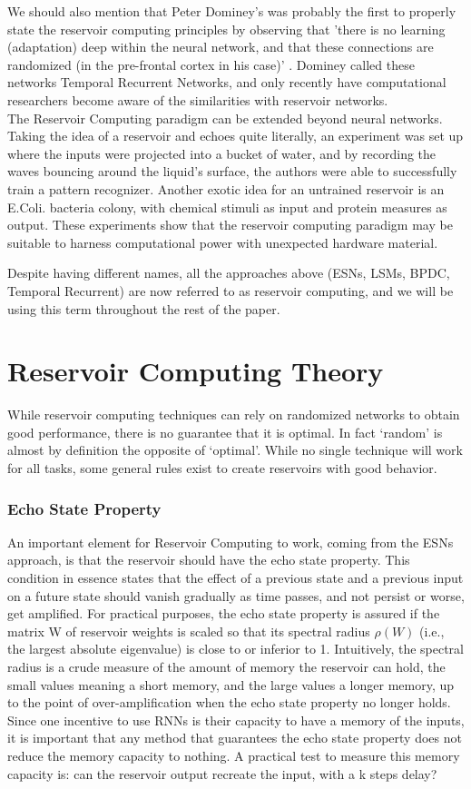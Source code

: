 \documentclass[12pt,oneside]{CUNY_CS_PhD}
\begin{document}
We should also mention that Peter Dominey's was probably the first to properly state the reservoir computing principles by observing that 'there is no learning (adaptation) deep within the neural network, and that these connections are randomized (in the pre-frontal cortex in his case)' \cite{DomineyRamus00}. Dominey called these networks Temporal Recurrent Networks, and only recently have computational researchers become aware of the similarities with reservoir networks.\\
The Reservoir Computing paradigm can be extended beyond neural networks. Taking the idea of a reservoir and echoes quite literally, an experiment was set up where the inputs were projected into a bucket of water, and by recording the waves bouncing around the liquid's surface, the authors were able to successfully train a pattern recognizer. Another exotic idea for an untrained reservoir is an E.Coli. bacteria colony, with chemical stimuli as input and protein measures as output. These experiments show that the reservoir computing paradigm may be suitable to harness computational power with unexpected hardware material.

Despite having different names, all the approaches above (ESNs, LSMs, BPDC, Temporal Recurrent) are now referred to as reservoir computing, and we will be using this term throughout the rest of the paper.

\section{Reservoir Computing Theory}
\label{theory} 
While reservoir computing techniques can rely on randomized networks to obtain good performance, there is no guarantee that it is optimal. In fact `random' is almost by definition the opposite of `optimal'. While no single technique will work for all tasks, some general rules exist to create reservoirs with good behavior.

\subsubsection{Echo State Property}
An important element for Reservoir Computing to work, coming from the ESNs approach, is that the reservoir should have the echo state property. This condition in essence states that the effect of a previous state and a previous input on a future state should vanish gradually as time passes, and not persist or worse, get amplified. For practical purposes, the echo state property is assured if the matrix W of reservoir weights is scaled so that its spectral radius $\rho(W)$ (i.e., the largest absolute eigenvalue) is close to or inferior to 1. Intuitively, the spectral radius is a crude measure of the amount of memory the reservoir can hold, the small values meaning a short memory, and the large values a longer memory, up to the point of over-amplification when the echo state property no longer holds. Since one incentive to use RNNs is their capacity to have a memory of the inputs, it is important that any method that guarantees the echo state property does not reduce the memory capacity to nothing. A practical test to measure this memory capacity is: can the reservoir output recreate the input, with a k steps delay? 
\end{document}
